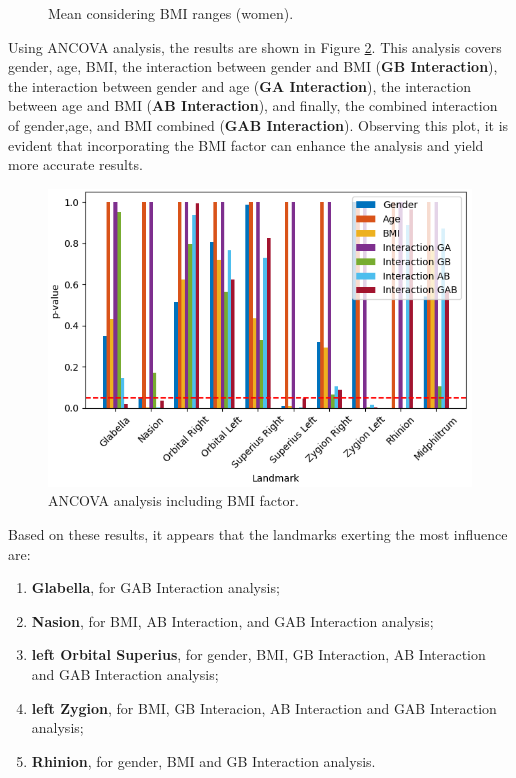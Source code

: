 \documentclass[journal,article,submit,pdftex,moreauthors]{Definitions/mdpi}
\begin{document}
\begin{figure}[H]
\begin{minipage}{0.52\textwidth}
        \vspace{-0.3cm}
        \caption{Mean considering BMI ranges (women).}
        \label{fig:fig8}
    \end{minipage}
\end{figure}


Using ANCOVA analysis, the results are shown in Figure \ref{fig:fig9}. This analysis covers gender, age, BMI, the interaction between gender and BMI (\textbf{GB Interaction}), the interaction between gender and age (\textbf{GA Interaction}), the interaction between age and BMI (\textbf{AB Interaction}), and finally, the combined interaction of gender,age, and BMI combined (\textbf{GAB Interaction}). Observing this plot, it is evident that incorporating the BMI factor can enhance the analysis and yield more accurate results.

\begin{figure}[H]
    \centering
    \includegraphics[width=0.6\linewidth]{Definitions/ANCOVA_BMI_after_cleaning.png}
    \vspace{-0.2cm}
    \caption{ANCOVA analysis including BMI factor.}
    \label{fig:fig9}
\end{figure}

\noindent Based on these results, it appears that the landmarks exerting the most influence are:
\begin{enumerate}
    \item \textbf{Glabella}, for GAB Interaction analysis;
    \item \textbf{Nasion}, for BMI, AB Interaction, and GAB Interaction analysis;
    \item \textbf{left Orbital Superius}, for gender, BMI, GB Interaction, AB Interaction and GAB Interaction analysis;
    \item \textbf{left Zygion}, for BMI, GB Interacion, AB Interaction and GAB Interaction analysis;
    \item \textbf{Rhinion}, for gender, BMI and GB Interaction analysis.

\end{enumerate}
\end{document}
